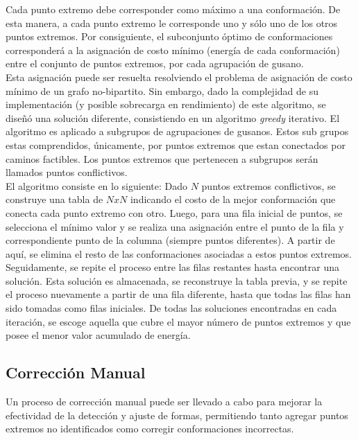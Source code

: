 Cada punto extremo debe corresponder como m\'aximo a una conformaci\'on. De esta
manera, a cada punto extremo le corresponde uno y s\'olo uno de los otros puntos extremos.
Por consiguiente, el subconjunto \'optimo de conformaciones corresponder\'a a la
asignaci\'on de costo m\'inimo (energ\'ia de cada conformaci\'on) entre el 
conjunto de puntos extremos, por cada agrupaci\'on de gusano.\\

Esta asignaci\'on puede ser resuelta resolviendo el problema de asignaci\'on de
costo m\'inimo de un grafo no-bipartito. Sin embargo, dado la complejidad de
su implementaci\'on (y posible sobrecarga en rendimiento) de este algoritmo,
se dise\~n\'o una soluci\'on diferente, consistiendo en un algoritmo \emph{greedy}
iterativo. El algoritmo es aplicado a subgrupos de agrupaciones de gusanos.
Estos sub grupos estas comprendidos, \'unicamente, por puntos extremos que estan
conectados por caminos factibles. Los puntos extremos que pertenecen a subgrupos
ser\'an llamados puntos conflictivos.\\

El algoritmo consiste en lo siguiente: Dado $N$ puntos extremos conflictivos, se
construye una tabla de $NxN$ indicando el costo de la mejor conformaci\'on que 
conecta cada punto extremo con otro. Luego, para una fila inicial de puntos,
se selecciona el m\'inimo valor y se realiza una asignaci\'on entre el punto
de la fila y correspondiente punto de la columna (siempre puntos diferentes).
A partir de aqu\'i, se elimina el resto de las conformaciones asociadas
a estos puntos extremos. Seguidamente, se repite el proceso entre las filas
restantes hasta encontrar una soluci\'on. Esta soluci\'on es almacenada, 
se reconstruye la tabla previa, y se repite el proceso nuevamente a partir
de una fila diferente, hasta que todas las filas han sido tomadas como
filas iniciales. De todas las soluciones encontradas en cada iteraci\'on,
se escoge aquella que cubre el mayor n\'umero de puntos extremos y que
posee el menor valor acumulado de energ\'ia.

\subsection{Correcci\'on Manual}
\label{sec:manualproc}

Un proceso de correcci\'on manual puede ser llevado a cabo para mejorar la efectividad
de la detecci\'on y ajuste de formas, permitiendo tanto agregar puntos extremos 
no identificados como corregir conformaciones incorrectas.

